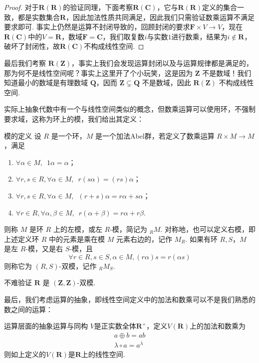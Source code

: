 \begin{proof}
    对于$\mathbf{R(R)}$的验证同理，下面考察$\mathbf{R}(\mathbf{C})$，它与$\mathbf{R(R)}$定义的集合一致，都是实数集合$\mathbf{R}$，因此加法性质共同满足，因此我们只需验证数乘运算不满足要求即可. 事实上仍然是运算不封闭导致的，回顾封闭的要求$\mathbf{F}\times V\to V$，现在$\mathbf{R(C)}$中的$V=\mathbf{R}$，数域$\mathbf{F}=\mathbf{C}$，我们取复数$i$与实数$1$进行数乘，结果为$i\notin\mathbf{R}$，破坏了封闭性，故$\mathbf{R(C)}$不构成线性空间.
\end{proof}

最后我们考察 $\mathbf{R(Z)}$，事实上我们会发现运算封闭以及与运算规律都是满足的，那为何不是线性空间呢？事实上这里开了个小玩笑，这是因为 $\mathbf{Z}$ 不是数域！我们知道最小的数域是有理数域 $\mathbf{Q}$，因而 $\mathbf{Z} \subsetneq \mathbf{Q}$ 不是数域，因此 $\mathbf{R(Z)}$ 不构成线性空间.

实际上抽象代数中有一个与线性空间类似的概念，但数乘运算可以使用环，不强制要求域，这称为环上的模，我们给出其定义：
\begin{definition}{模的定义}{}
    设 $R$ 是一个环，$M$ 是一个加法Abel群，若定义了数乘运算 $R \times M \to M$，满足
    \begin{enumerate}
        \item $\forall \alpha \in M, \enspace 1\alpha = \alpha$；
        \item $\forall r, s \in R, \forall \alpha \in M, \enspace r(s\alpha) = (rs)\alpha$；
        \item $\forall r, s \in R, \forall \alpha \in M, \enspace (r+s)\alpha = r\alpha + s\alpha$；
        \item $\forall r \in R, \forall \alpha, \beta \in M, \enspace r(\alpha + \beta) = r\alpha + r\beta$.
    \end{enumerate}
    则称 $M$ 是环 $R$ 上的左模，或左 $R$-模，简记为 $_R M$. 对称地，也可以定义右模，即上述定义环 $R$ 中的元素是乘在模 $M$ 元素右边的，记作 $M_R$. 如果有环 $R, S$，$M$ 是左 $R$-模，又是右 $S$-模，且
    \[
        \forall r \in R, s \in S, \alpha \in M, (r \alpha) s = r (\alpha s)
    \]
    则称它为 $(R, S)$-双模，记作 $_R M_S$.
\end{definition}

不难验证 $\mathbf{R}$ 是 $(\mathbf{Z},\mathbf{Z})$-双模.

最后，我们考虑运算的抽象，即线性空间定义中的加法和数乘可以不是我们熟悉的数之间的运算：
\begin{example}{运算层面的抽象}{运算与同构}
    $V$是正实数全体$\mathbf{R}^+$，定义$V(\mathbf{R})$上的加法和数乘为
    \begin{gather*}
        a\oplus b=ab \\
        \lambda\circ a=a^\lambda
    \end{gather*}
    则如上定义的$V(\mathbf{R})$是$\mathbf{R}$上的线性空间.
\end{example}

